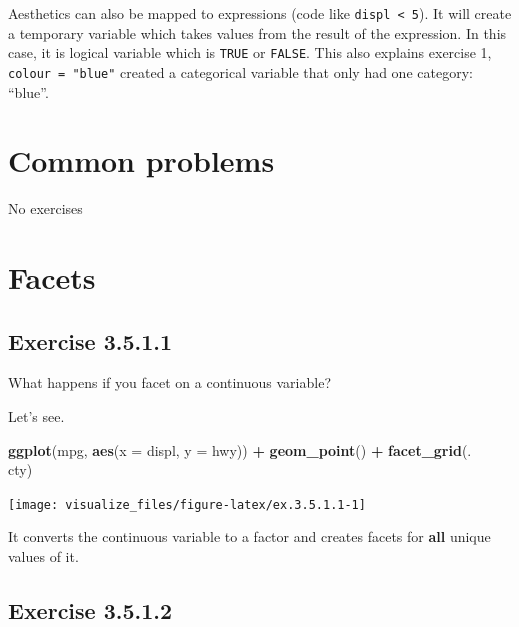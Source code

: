 \documentclass[]{book}
\newenvironment{Shaded}{\begin{snugshade}}{\end{snugshade}}
\newcommand{\DataTypeTok}[1]{\textcolor[rgb]{0.13,0.29,0.53}{#1}}
\newcommand{\KeywordTok}[1]{\textcolor[rgb]{0.13,0.29,0.53}{\textbf{#1}}}
\newcommand{\NormalTok}[1]{#1}
\newcommand{\OperatorTok}[1]{\textcolor[rgb]{0.81,0.36,0.00}{\textbf{#1}}}
\newcommand{\StringTok}[1]{\textcolor[rgb]{0.31,0.60,0.02}{#1}}
\theoremstyle{plain}
\theoremstyle{remark}
\begin{document}
Aesthetics can also be mapped to expressions (code like \texttt{displ\ \textless{}\ 5}).
It will create a temporary variable which takes values from the result of the expression.
In this case, it is logical variable which is \texttt{TRUE} or \texttt{FALSE}.
This also explains exercise 1, \texttt{colour\ =\ "blue"} created a categorical variable that only had one category: ``blue''.

\hypertarget{common-problems}{%
\section{Common problems}\label{common-problems}}

No exercises

\hypertarget{facets}{%
\section{Facets}\label{facets}}

\hypertarget{exercise-3.5.1.1}{%
\subsection*{\texorpdfstring{Exercise {3.5.1.1}}{Exercise 3.5.1.1}}\label{exercise-3.5.1.1}}

What happens if you facet on a continuous variable?

Let's see.

\begin{Shaded}
\begin{Highlighting}[]
\KeywordTok{ggplot}\NormalTok{(mpg, }\KeywordTok{aes}\NormalTok{(}\DataTypeTok{x =}\NormalTok{ displ, }\DataTypeTok{y =}\NormalTok{ hwy)) }\OperatorTok{+}
\StringTok{  }\KeywordTok{geom_point}\NormalTok{() }\OperatorTok{+}
\StringTok{  }\KeywordTok{facet_grid}\NormalTok{(. }\OperatorTok{~}\StringTok{ }\NormalTok{cty)}
\end{Highlighting}
\end{Shaded}

\begin{center}\texttt{[image: visualize\_files/figure-latex/ex.3.5.1.1-1]} \end{center}

It converts the continuous variable to a factor and creates facets for \textbf{all} unique values of it.

\hypertarget{exercise-3.5.1.2}{%
\subsection*{\texorpdfstring{Exercise {3.5.1.2}}{Exercise 3.5.1.2}}\label{exercise-3.5.1.2}}
\end{document}
